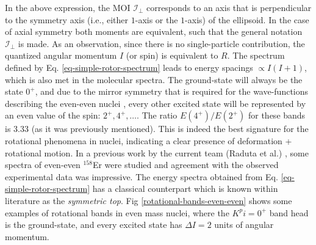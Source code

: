 In the above expression, the MOI $\mathcal{I}_\perp$ corresponds to an axis that is perpendicular to the symmetry axis (i.e., either $1$-axis or the $1$-axis) of the ellipsoid. In the case of axial symmetry both moments are equivalent, such that the general notation $\mathcal{I}_\perp$ is made. As an observation, since there is no single-particle contribution, the quantized angular momentum $I$ (or spin) is equivalent to $R$. The spectrum defined by Eq. \ref{eq-simple-rotor-spectrum} leads to energy spacings $\propto I(I+1)$, which is also met in the  molecular spectra. The ground-state will always be the state $0^+$, and due to the mirror symmetry that is required for the wave-functions describing the even-even nuclei \cite{ring2004nuclear}, every other excited state will be represented by an even value of the spin: $2^+,4^+,\dots$.
The ratio $E(4^+)/E(2^+)$ for these bands is $3.33$ (as it was previously mentioned). This is indeed the best signature for the rotational phenomena in nuclei, indicating a clear presence of deformation + rotational motion. In a previous work by the current team (Raduta et al.) \cite{raduta2017semiclassical}, some spectra of even-even $^{158}$Er were studied and agreement with the observed experimental data was impressive. The energy spectra obtained from Eq. \ref{eq-simple-rotor-spectrum} has a classical counterpart which is known within literature as the \emph{symmetric top}. Fig \ref{rotational-bands-even-even} shows some examples of rotational bands in even mass nuclei, where the $K^pi=0^+$ band head is the ground-state, and every excited state has $\Delta I=2$ units of angular momentum.

